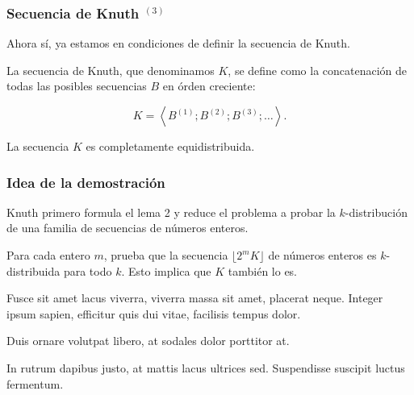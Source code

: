 \documentclass[t, 10pt, mathserif]{beamer}
\begin{document}

\begin{frame}
  \frametitle{Secuencia de Knuth {$^{(3)}$}}

  Ahora sí, ya estamos en condiciones de definir la secuencia de Knuth.
  \pause

  \medskip
  \begin{definition}
    La secuencia de Knuth, que denominamos $K$, se define como la concatenación de todas las posibles secuencias $B$ en órden creciente:
    \pause

    \begin{equation*}
      K = \left< B^{(1)} ; B^{(2)} ;  B^{(3)} ; \dots \right> \text{.}
    \end{equation*}
  \end{definition}
  \pause

  \begin{theorem}
    La secuencia $K$ es completamente equidistribuida.
  \end{theorem}
\end{frame}


\begin{frame}
  \frametitle{Idea de la demostración}

  Knuth primero formula el lema 2 y reduce el problema a probar la $k$-distribución de una familia de secuencias de números enteros.
  \pause
  
  Para cada entero $m$, prueba que la secuencia $\lfloor 2^m K \rfloor$ de números enteros es $k$-distribuida para todo $k$. Esto implica que $K$ también lo es.
  \pause

  \medskip
  \begin{definition}
    Fusce sit amet lacus viverra, viverra massa sit amet, placerat neque. Integer ipsum sapien, efficitur quis dui vitae, facilisis tempus dolor.
    \pause

    Duis ornare volutpat libero, at sodales dolor porttitor at.
    \pause
  \end{definition}

  In rutrum dapibus justo, at mattis lacus ultrices sed. Suspendisse suscipit luctus fermentum.
\end{frame}


\end{document}
